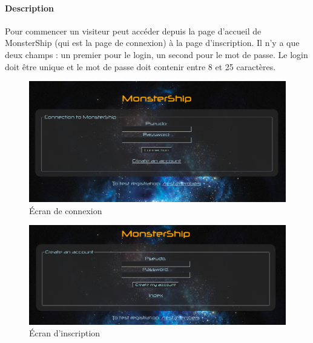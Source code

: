 \documentclass[a4paper,11pt]{report}
\begin{document}
      \paragraph{Description}
        Pour commencer un visiteur peut accéder depuis la page d'accueil de MonsterShip (qui est la page de connexion) à la page d'inscription. Il n'y a que deux champs : un premier pour le login, un second pour le mot de passe. Le login doit être unique et le mot de passe doit contenir entre 8 et 25 caractères.
        \begin{figure}[H]
          \begin{center}
            \includegraphics[width=.8\textwidth]{images/connexion.png}
            \caption{Écran de connexion}
            \label{fig:ec_co}
          \end{center}
        \end{figure}
        \begin{figure}[H]
          \begin{center}
            \includegraphics[width=.8\textwidth]{images/inscription.png}
            \caption{Écran d'inscription}
            \label{fig:ec_inc}
          \end{center}
        \end{figure}
        
\end{document}
